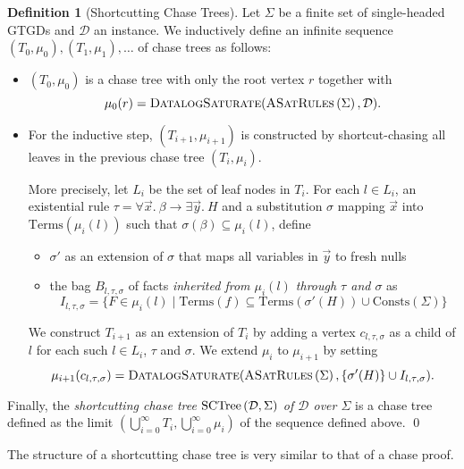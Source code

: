 \documentclass[12pt]{report}
\theoremstyle{plain}
\theoremstyle{definition}
\newtheorem{definition}[theorem]{Definition}
\def\Consts{{\mathrm{Consts}}}
\def\Terms{{\mathrm{Terms}}}
\newcommand{\ASatRules}[1]{\ensuremath{\normalfont{\textsc{ASatRules}} \left( #1 \right)}}
\newcommand{\SCTree}[2]{\ensuremath{\normalfont{\textrm{SCTree}} \left( #1, #2 \right)}}
\begin{document}
\begin{definition}[Shortcutting Chase Trees]
  Let $\Sigma$ be a finite set of single-headed GTGDs and $\mathcal{D}$ an instance. We inductively define an infinite sequence $(T_0, \mu_0), (T_1, \mu_1), \ldots$ of chase trees as follows:
  \begin{itemize}
    \item $(T_0, \mu_0)$ is a chase tree with only the root vertex $r$ together with $$\mu_0(r) = \textsc{DatalogSaturate}(\ASatRules{\Sigma}, \mathcal{D}).$$
    \item For the inductive step, $(T_{i + 1}, \mu_{i + 1})$ is constructed by shortcut-chasing all leaves in the previous chase tree $(T_i, \mu_i)$.
    
    More precisely, let $L_i$ be the set of leaf nodes in $T_i$. For each $l \in L_i$, an existential rule $\tau = \forall \vec{x}.\ \beta \rightarrow \exists \vec{y}.\ H$ and a substitution $\sigma$ mapping $\vec{x}$ into $\Terms(\mu_i(l))$ such that $\sigma(\beta) \subseteq \mu_i(l)$, define
    \begin{itemize}
      \item $\sigma'$ as an extension of $\sigma$ that maps all variables in $\vec{y}$ to fresh nulls
      \item the bag $B_{l, \tau, \sigma}$ of facts \emph{inherited from $\mu_i(l)$ through $\tau$ and $\sigma$} as $$I_{l, \tau, \sigma} = \{ F \in \mu_i(l) \mid \Terms(f) \subseteq \Terms(\sigma'(H)) \cup \Consts(\Sigma) \}$$
    \end{itemize}
    We construct $T_{i+1}$ as an extension of $T_i$ by adding a vertex $c_{l, \tau, \sigma}$ as a child of $l$ for each such $l \in L_i$, $\tau$ and $\sigma$. We extend $\mu_i$ to $\mu_{i+1}$ by setting $$\mu_{i+1}(c_{l, \tau, \sigma}) = \textsc{DatalogSaturate}(\ASatRules{\Sigma}, \{ \sigma'(H) \} \cup I_{l, \tau, \sigma}).$$
  \end{itemize}
  Finally, the \emph{shortcutting chase tree $\SCTree{\mathcal{D}}{\Sigma}$ of $\mathcal{D}$ over $\Sigma$} is a chase tree defined as the limit $(\bigcup_{i = 0}^\infty T_i, \bigcup_{i = 0}^\infty \mu_i)$ of the sequence defined above.
  \qed
\end{definition}


The structure of a shortcutting chase tree is very similar to that of a chase proof.
\end{document}
